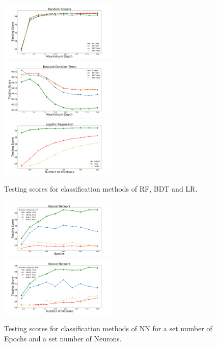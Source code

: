 \begin{figure}[h]
\center
\includegraphics[width=0.5\textwidth]{plots/rf_train_multi.pdf}\\
\includegraphics[width=0.5\textwidth]{plots/bdt_train_multi.pdf}
\includegraphics[width=0.5\textwidth]{plots/lr_train_multi.pdf}
\caption{Testing scores for classification methods of RF, BDT and LR.}
\label{fig:tree_multi}
\end{figure}
\begin{figure}[h]
\center
\includegraphics[width=0.5\textwidth]{plots/nn_epoch_train_multi.pdf}\\
\includegraphics[width=0.5\textwidth]{plots/nn_neuron_train_multi.pdf}
\caption{Testing scores for classification methods of NN for a set number of Epochs and a set number of Neurons.}
\label{fig:nets_multi}
\end{figure}

